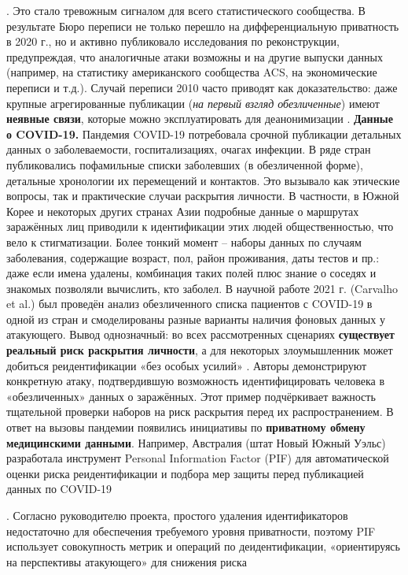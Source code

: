 \autocite{blog-seas-upenn-edu}
. Это стало тревожным сигналом для всего статистического сообщества. В результате Бюро переписи не только перешло на дифференциальную приватность в 2020 г., но и активно публиковало исследования по реконструкции, предупреждая, что аналогичные атаки возможны и на другие выпуски данных (например, на статистику американского сообщества ACS, на экономические переписи и т.д.). Случай переписи 2010 часто приводят как доказательство: даже крупные агрегированные публикации (\textit{на первый взгляд обезличенные}) имеют \textbf{неявные связи}, которые можно эксплуатировать для деанонимизации
\autocite{blog-seas-upenn-edu}
. \textbf{Данные о COVID-19.} Пандемия COVID-19 потребовала срочной публикации детальных данных о заболеваемости, госпитализациях, очагах инфекции. В ряде стран публиковались пофамильные списки заболевших (в обезличенной форме), детальные хронологии их перемещений и контактов. Это вызывало как этические вопросы, так и практические случаи раскрытия личности. В частности, в Южной Корее и некоторых других странах Азии подробные данные о маршрутах заражённых лиц приводили к идентификации этих людей общественностью, что вело к стигматизации. Более тонкий момент – наборы данных по случаям заболевания, содержащие возраст, пол, район проживания, даты тестов и пр.: даже если имена удалены, комбинация таких полей плюс знание о соседях и знакомых позволяли вычислить, кто заболел. В научной работе 2021 г. (Carvalho et al.) был проведён анализ обезличенного списка пациентов с COVID-19 в одной из стран и смоделированы разные варианты наличия фоновых данных у атакующего. Вывод однозначный: во всех рассмотренных сценариях \textbf{существует реальный риск раскрытия личности}, а для некоторых злоумышленник может добиться реидентификации «без особых усилий»
\autocite{journals-plos-org}
. Авторы демонстрируют конкретную атаку, подтвердившую возможность идентифицировать человека в «обезличенных» данных о заражённых. Этот пример подчёркивает важность тщательной проверки наборов на риск раскрытия перед их распространением. В ответ на вызовы пандемии появились инициативы по \textbf{приватному обмену медицинскими данными}. Например, Австралия (штат Новый Южный Уэльс) разработала инструмент Personal Information Factor (PIF) для автоматической оценки риска реидентификации и подбора мер защиты перед публикацией данных по COVID-19


. Согласно руководителю проекта, простого удаления идентификаторов недостаточно для обеспечения требуемого уровня приватности, поэтому PIF использует совокупность метрик и операций по деидентификации, «ориентируясь на перспективы атакующего» для снижения риска


